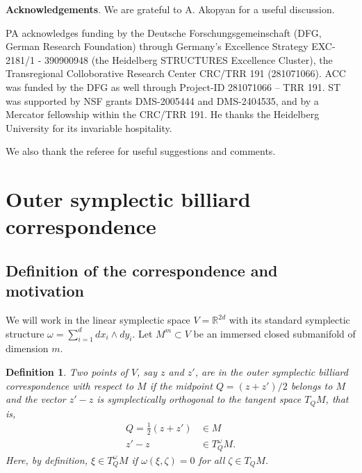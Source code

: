 \documentclass[12pt]{article}
\newtheorem{definition}[lemma]{Definition}
\newcommand{\R}{{\mathbb R}}
\begin{document}
\bigskip

{\bf Acknowledgements}. We are grateful to A. Akopyan for a useful discussion.

PA acknowledges funding by the Deutsche Forschungsgemeinschaft (DFG, German Research Foundation) through Germany's Excellence Strategy EXC-2181/1 - 390900948 (the Heidelberg STRUCTURES Excellence Cluster), the Transregional Colloborative Research Center CRC/TRR 191 (281071066). ACC was funded by the DFG as well through Project-ID 281071066 – TRR 191.
ST was supported by NSF grants DMS-2005444 and DMS-2404535, and by a Mercator fellowship within the CRC/TRR 191. He thanks the Heidelberg University for its invariable hospitality.

We also thank the referee for useful suggestions and comments.

\section{Outer symplectic  billiard correspondence} \label{sect:corr}

\subsection{Definition of the correspondence and motivation} \label{subsect:def}

We will work in the linear symplectic space $V=\R^{2d}$ with its standard symplectic structure $\omega=\sum_{i=1}^d dx_i \wedge dy_i$. Let $M^m \subset V$ be an immersed closed submanifold of dimension $m$.

\begin{definition}
{\rm Two points of $V$, say $z$ and $z'$, are in the outer symplectic billiard correspondence with respect to $M$ if the midpoint $Q=(z+z')/2$ belongs to $M$ and the vector $z'-z$ is symplectically orthogonal to the tangent space $T_Q M$, that is,
\begin{equation}\nonumber
\begin{aligned}
Q=\tfrac12(z+z')&\in M\\
z'-z&\in T^\omega_Q M.
\end{aligned}
\end{equation}
Here, by definition, $\xi\in T^\omega_Q M$ if $\omega(\xi,\zeta)=0$ for all $\zeta\in T_Q M$.
}
\end{definition}

\end{document}
